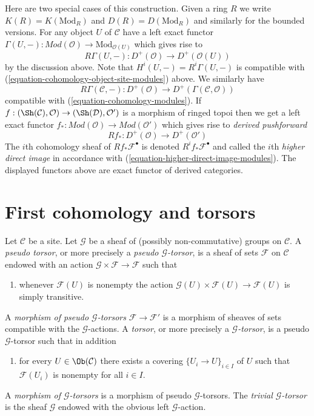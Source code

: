 \medskip\noindent
Here are two special cases of this construction. Given a ring $R$ we write
$K(R) = K(\text{Mod}_R)$ and $D(R) = D(\text{Mod}_R)$ and similarly for the
bounded versions. For any object $U$ of $\mathcal{C}$ have a left exact functor
$
\Gamma(U, -) :
\textit{Mod}(\mathcal{O})
\longrightarrow
\text{Mod}_{\mathcal{O}(U)}
$
which gives rise to
$$
R\Gamma(U, -) :
D^{+}(\mathcal{O})
\longrightarrow
D^{+}(\mathcal{O}(U))
$$
by the discussion above. Note that $H^i(U, -) = R^i\Gamma(U, -)$
is compatible with (\ref{equation-cohomology-object-site-modules}) above.
We similarly have
$$
R\Gamma(\mathcal{C}, -) :
D^{+}(\mathcal{O})
\longrightarrow
D^{+}(\Gamma(\mathcal{C}, \mathcal{O}))
$$
compatible with (\ref{equation-cohomology-modules}). If
$f : (\Sh(\mathcal{C}), \mathcal{O}) \to (\Sh(\mathcal{D}), \mathcal{O}')$
is a morphism of ringed topoi then we get a left exact functor
$f_* : \textit{Mod}(\mathcal{O}) \to \textit{Mod}(\mathcal{O}')$
which gives rise to {\it derived pushforward}
$$
Rf_* : D^{+}(\mathcal{O}) \to D^+(\mathcal{O}')
$$
The $i$th cohomology sheaf of $Rf_*\mathcal{F}^\bullet$ is denoted
$R^if_*\mathcal{F}^\bullet$ and called the $i$th {\it higher direct image}
in accordance with (\ref{equation-higher-direct-image-modules}).
The displayed functors above are exact functor
of derived categories.







\section{First cohomology and torsors}
\label{section-h1-torsors}

\begin{definition}
\label{definition-torsor}
Let $\mathcal{C}$ be a site.
Let $\mathcal{G}$ be a sheaf of (possibly non-commutative)
groups on $\mathcal{C}$.
A {\it pseudo torsor}, or more precisely a
{\it pseudo $\mathcal{G}$-torsor}, is a sheaf
of sets $\mathcal{F}$ on $\mathcal{C}$ endowed with an action
$\mathcal{G} \times \mathcal{F} \to \mathcal{F}$ such that
\begin{enumerate}
\item whenever $\mathcal{F}(U)$ is nonempty the action
$\mathcal{G}(U) \times \mathcal{F}(U) \to \mathcal{F}(U)$
is simply transitive.
\end{enumerate}
A {\it morphism of pseudo $\mathcal{G}$-torsors}
$\mathcal{F} \to \mathcal{F}'$
is a morphism of sheaves of sets compatible with the
$\mathcal{G}$-actions.
A {\it torsor}, or more precisely a
{\it $\mathcal{G}$-torsor}, is a pseudo $\mathcal{G}$-torsor such that
in addition
\begin{enumerate}
\item[(2)] for every $U \in \Ob(\mathcal{C})$
there exists a covering $\{U_i \to U\}_{i \in I}$ of $U$
such that $\mathcal{F}(U_i)$ is nonempty for all $i \in I$.
\end{enumerate}
A {\it morphism of $\mathcal{G}$-torsors} is a morphism of
pseudo $\mathcal{G}$-torsors.
The {\it trivial $\mathcal{G}$-torsor}
is the sheaf $\mathcal{G}$ endowed with the obvious left
$\mathcal{G}$-action.
\end{definition}

